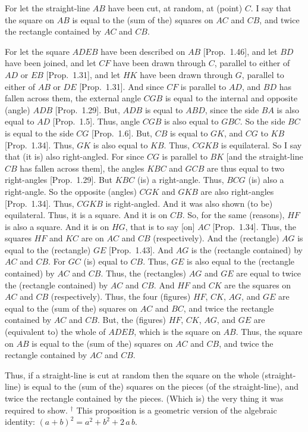 For let the straight-line $AB$ have been cut, at random, at  (point) $C$. I say that the square on $AB$
is equal to the (sum of the) squares on $AC$ and $CB$, and twice the rectangle
contained by $AC$ and $CB$.

For let the square $ADEB$ have been described on $AB$ [Prop.~1.46], and let $BD$ have been joined, and let $CF$ have been drawn through $C$, parallel to either of $AD$ or $EB$ [Prop.~1.31],
and let $HK$ have been drawn through $G$, parallel to either of $AB$ or $DE$ [Prop.~1.31].
And since $CF$ is parallel to $AD$, and $BD$ has fallen across them, the external
angle $CGB$ is equal to the internal and opposite (angle) $ADB$ [Prop.~1.29].
But, $ADB$ is equal to $ABD$, since the side $BA$ is also equal to $AD$ [Prop.~1.5].
Thus, angle $CGB$ is also equal to $GBC$. So the side $BC$ is equal to the side $CG$ [Prop.~1.6]. But, $CB$ is equal to $GK$, and $CG$ to $KB$ [Prop.~1.34]. Thus, $GK$
is also equal to $KB$. Thus, $CGKB$ is equilateral. So I say that (it is) also right-angled. For since $CG$ is parallel to $BK$ [and the straight-line $CB$ has fallen across them], the angles $KBC$ and $GCB$ are thus equal to two 
right-angles
[Prop.~1.29]. But $KBC$ (is) a right-angle. Thus, 
$BCG$ (is) also a right-angle.
So the opposite (angles) $CGK$ and $GKB$ are also right-angles [Prop.~1.34]. Thus,
$CGKB$ is right-angled. And it was also shown (to be) equilateral. Thus,
it is a square. And it is on $CB$. So, for the same (reasons), $HF$ is  also a square.
And it is on $HG$, that is to say [on] $AC$ [Prop.~1.34]. Thus, the squares $HF$ and
$KC$ are on $AC$ and $CB$ (respectively). And  the (rectangle) $AG$ is
equal to the (rectangle) $GE$ [Prop.~1.43]. And $AG$ is  the (rectangle contained)
by $AC$ and $CB$. For $GC$ (is) equal to $CB$. Thus, $GE$ is also equal to the
(rectangle contained) by $AC$ and $CB$. Thus, the (rectangles)
$AG$ and $GE$ are equal to twice the (rectangle contained) by $AC$ and $CB$.
And $HF$ and $CK$ are the squares on $AC$ and $CB$ (respectively). Thus, the
four (figures) $HF$, $CK$, $AG$, and $GE$ are equal to the (sum of the) squares on $AC$ and
$BC$, and twice the rectangle contained by $AC$ and $CB$. But, the  (figures) $HF$, $CK$, $AG$, and $GE$ are (equivalent to) the whole of $ADEB$, which is the square on $AB$. 
Thus, the square on $AB$ is equal to the (sum of the) squares on $AC$ and $CB$, and twice
the rectangle contained by $AC$ and $CB$.

Thus, if a straight-line is cut at random then the square on the whole (straight-line) is equal to the (sum of the) squares on the pieces (of the
straight-line), and twice the
rectangle contained by the pieces. (Which is) the very thing it was required to
show.
{\footnotesize \noindent$^\dag$ This proposition is a geometric version
of the algebraic identity: $(a+b)^2 = a^2 + b^2+ 2\,a\,b$.}

